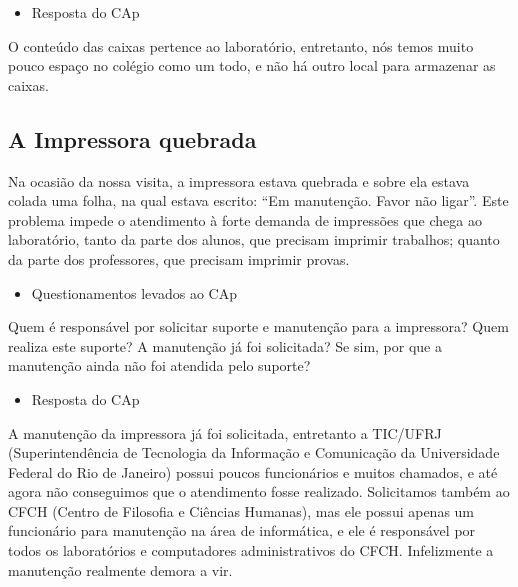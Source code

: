 \begin{itemize}
    \item Resposta do CAp
\end{itemize}

O conteúdo das caixas pertence ao laboratório, entretanto, nós temos muito pouco espaço no colégio como um todo, e não há outro local para armazenar as caixas.

\subsection{A Impressora quebrada}\label{sec:LABEL_CHP_REL_SEC_PROBS_SUBSEC_IMP}

Na ocasião da nossa visita, a impressora estava quebrada e sobre ela estava colada uma folha, na qual estava escrito: “Em manutenção. Favor não ligar”. Este problema impede o atendimento à forte demanda de impressões que chega ao laboratório, tanto da parte dos alunos, que precisam imprimir trabalhos; quanto da parte dos professores, que precisam imprimir provas.

\begin{itemize}
    \item Questionamentos levados ao CAp
\end{itemize}

Quem é responsável por solicitar suporte e manutenção para a impressora? Quem realiza este suporte? A manutenção já foi solicitada? Se sim, por que a manutenção ainda não foi atendida pelo suporte?

\begin{itemize}
    \item Resposta do CAp
\end{itemize}

A manutenção da impressora já foi solicitada, entretanto a TIC/UFRJ (Superintendência de Tecnologia da Informação e Comunicação da Universidade Federal do Rio de Janeiro) possui poucos funcionários e muitos chamados, e até agora não conseguimos que o atendimento fosse realizado. Solicitamos também ao CFCH (Centro de Filosofia e Ciências Humanas), mas ele possui apenas um funcionário para manutenção na área de informática, e ele é responsável por todos os laboratórios e computadores administrativos do CFCH. Infelizmente a manutenção realmente demora a vir.

